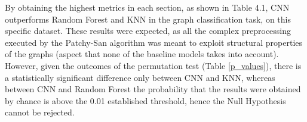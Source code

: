 By obtaining the highest metrics in each section, as shown in Table 4.1, CNN outperforms Random Forest and KNN in the graph classification task, on this specific dataset. These results were expected, as all the complex preprocessing executed by the Patchy-San algorithm was meant to exploit structural properties of the graphs (aspect that none of the baseline models takes into account). However, given the outcomes of the permutation test (Table \ref{p_values}), there is a statistically significant difference only between CNN and KNN, whereas between CNN and Random Forest the probability that the results were obtained by chance is above the 0.01 established threshold, hence the Null Hypothesis cannot be rejected. 






